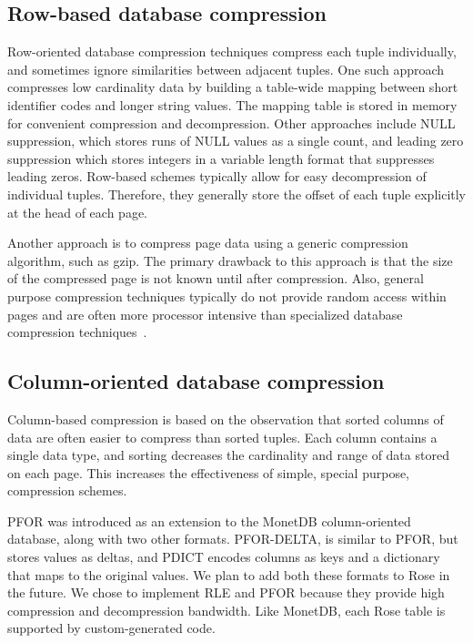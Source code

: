 \documentclass{vldb}
\newcommand{\rows}{Rose\xspace}
\begin{document}
\subsection{Row-based database compression}

Row-oriented database compression techniques compress each tuple
individually, and sometimes ignore similarities between adjacent
tuples.  One such approach compresses low cardinality data by building a
table-wide mapping between short identifier codes and longer string
values. The mapping table is stored in memory for convenient
compression and decompression.  Other approaches include NULL
suppression, which stores runs of NULL values as a single count, and
leading zero suppression which stores integers in a variable length
format that suppresses leading zeros.  Row-based schemes typically
allow for easy decompression of individual tuples.  Therefore, they
generally store the offset of each tuple explicitly at the head of
each page.

Another approach is to compress page data using a generic compression
algorithm, such as gzip.  The primary drawback to this approach is
that the size of the compressed page is not known until after
compression.  Also, general purpose compression techniques typically
do not provide random access within pages and are often more processor
intensive than specialized database compression
techniques~\cite{rowImplementationPerf}.

\subsection{Column-oriented database compression}

Column-based compression is based on the observation that sorted
columns of data are often easier to compress than sorted tuples.  Each
column contains a single data type, and sorting decreases the
cardinality and range of data stored on each page.  This increases the
effectiveness of simple, special purpose, compression schemes.

PFOR was introduced as an extension to
the MonetDB\cite{pfor} column-oriented database, along with two other
formats.  PFOR-DELTA, is similar to PFOR, but stores values as
deltas, and PDICT encodes columns as keys and a dictionary that
maps to the original values.  We plan to add both these formats to
\rows in the future.  We chose to implement RLE and PFOR because they
provide high compression and decompression bandwidth.  Like MonetDB,
each \rows table is supported by custom-generated code.
\end{document}
